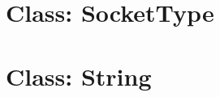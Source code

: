 %
%

\hypertarget{qconnectbase-constants-class-sockettype-41}{%
\section{Class: SocketType}\label{qconnectbase-constants-class-sockettype-41}}

\begin{Shaded}
\begin{Highlighting}[]
\end{Highlighting}
\end{Shaded}

\hypertarget{qconnectbase-constants-class-string-42}{%
\section{Class: String}\label{qconnectbase-constants-class-string-42}}

\begin{Shaded}
\begin{Highlighting}[]
\end{Highlighting}
\end{Shaded}
